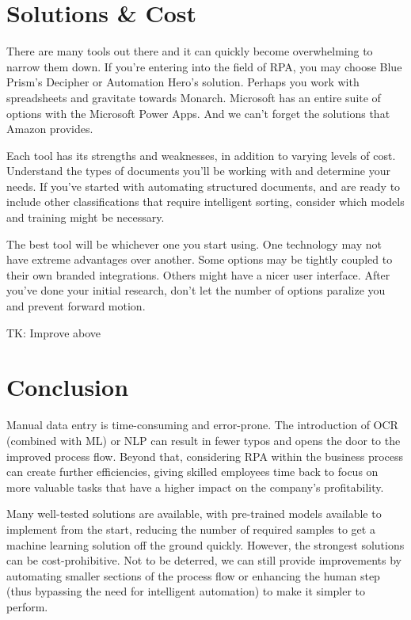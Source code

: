 \documentclass[conference]{IEEEtran}
\begin{document}
\section{Solutions \& Cost} \label{sectionSolutionsCost}
There are many tools out there and it can quickly become overwhelming to narrow them down. If you're entering into the field of RPA, you may choose Blue Prism's Decipher or Automation Hero's solution. Perhaps you work with spreadsheets and gravitate towards Monarch. Microsoft has an entire suite of options with the Microsoft Power Apps. And we can't forget the solutions that Amazon provides.

Each tool has its strengths and weaknesses, in addition to varying levels of cost. Understand the types of documents you'll be working with and determine your needs. If you've started with automating structured documents, and are ready to include other classifications that require intelligent sorting, consider which models and training might be necessary.

The best tool will be whichever one you start using. One technology may not have extreme advantages over another. Some options may be tightly coupled to their own branded integrations. Others might have a nicer user interface. After you've done your initial research, don't let the number of options paralize you and prevent forward motion.

TK: Improve above

\section{Conclusion}
Manual data entry is time-consuming and error-prone. The introduction of OCR (combined with ML) or NLP can result in fewer typos and opens the door to the improved process flow. Beyond that, considering RPA within the business process can create further efficiencies, giving skilled employees time back to focus on more valuable tasks that have a higher impact on the company's profitability.

Many well-tested solutions are available, with pre-trained models available to implement from the start, reducing the number of required samples to get a machine learning solution off the ground quickly. However, the strongest solutions can be cost-prohibitive. Not to be deterred, we can still provide improvements by automating smaller sections of the process flow or enhancing the human step (thus bypassing the need for intelligent automation) to make it simpler to perform.
\end{document}
